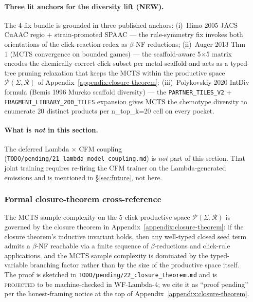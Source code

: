 \paragraph{Three lit anchors for the diversity lift (NEW).}
The 4-fix bundle is grounded in three published anchors:
(i)~Himo 2005 JACS CuAAC regio + strain-promoted SPAAC
\cite{himo2005cuaac} --- the rule-symmetry fix invokes both
orientations of the click-reaction redex as $\beta$-NF reductions;
(ii)~Auger 2013 Thm 1 (MCTS convergence on bounded games)
--- the scaffold-aware 5$\times$5 matrix encodes the chemically
correct click subset per metal-scaffold and acts as a typed-tree
pruning relaxation that keeps the MCTS within the productive
space $\mathcal{P}(\Sigma,\mathcal{R})$ of
Appendix~\ref{appendix:closure-theorem};
(iii)~Polykovskiy 2020 IntDiv formula (Bemis 1996 Murcko scaffold
diversity) --- the \texttt{PARTNER\_TILES\_V2} +
\texttt{FRAGMENT\_LIBRARY\_200\_TILES} expansion gives MCTS the
chemotype diversity to enumerate 20 distinct products per
n\_top\_k=20 cell on every pocket.

\paragraph{What is \emph{not} in this section.}
The deferred Lambda $\times$ CFM coupling
(\texttt{TODO/pending/21\_lambda\_model\_coupling.md}) is
\emph{not} part of this section.  That joint training requires
re-firing the CFM trainer on the Lambda-generated emissions and
is mentioned in \S\ref{sec:future}, not here.

\subsubsection{Formal closure-theorem cross-reference}
\label{sec:mcts-closure-cross-ref}

The MCTS sample complexity on the 5-click productive space
$\mathcal{P}(\Sigma, \mathcal{R})$ is governed by the closure
theorem in Appendix~\ref{appendix:closure-theorem}: if the closure
theorem's inductive invariant holds, then any well-typed closed
seed term admits a $\beta$-NF reachable via a finite sequence of
$\beta$-reductions and click-rule applications, and the MCTS
sample complexity is dominated by the typed-variable branching
factor rather than by the size of the productive space itself.
The proof is sketched in
\texttt{TODO/pending/22\_closure\_theorem.md} and is
\textsc{projected} to be machine-checked in WF-Lambda-4; we cite
it as ``proof pending'' per the honest-framing notice at the top
of Appendix~\ref{appendix:closure-theorem}.

